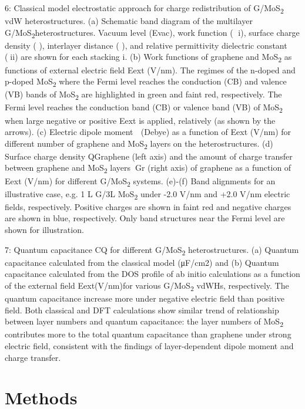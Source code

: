  
 6: Classical model electrostatic approach for charge redistribution of G/MoS\textsubscript{2} vdW heterostructures. (a) Schematic band diagram of the multilayer G/MoS\textsubscript{2}heterostructures. Vacuum level (Evac), work function ( i), surface charge density ( ), interlayer distance ( ),  and relative permittivity dielectric constant (ii) are shown for each stacking i. (b) Work functions of graphene and MoS\textsubscript{2} as functions of external electric field Eext (V/nm). The regimes of the n-doped and p-doped MoS\textsubscript{2} where the Fermi level reaches the conduction (CB) and valence (VB) bands of MoS\textsubscript{2} are highlighted in green and faint red, respectively. The Fermi level reaches the conduction band (CB) or valence band (VB) of MoS\textsubscript{2} when large negative or positive Eext is applied, relatively (as shown by the arrows). (c) Electric dipole moment  (Debye) as a function of Eext (V/nm) for different number of graphene and MoS\textsubscript{2} layers on the heterostructures. (d) Surface charge density QGraphene (left axis) and the amount of charge transfer between graphene and MoS\textsubscript{2} layersGr (right axis) of graphene as a function of Eext (V/nm) for different G/MoS\textsubscript{2} systems. (e)-(f) Band alignments for an illustrative case, e.g. 1 L G/3L MoS\textsubscript{2} under -2.0 V/nm and +2.0 V/nm electric fields, respectively. Positive charges are shown in faint red and negative charges are shown in blue, respectively. Only band structures near the Fermi level are shown for illustration. 
 
 7: Quantum capacitance CQ for different G/MoS\textsubscript{2} heterostructures. (a) Quantum capacitance calculated from the classical model    (μF/cm2)  and (b) Quantum capacitance calculated from the DOS profile of ab initio  calculations   as a function of the external field Eext(V/nm)for various G/MoS\textsubscript{2} vdWHs, respectively. The quantum capacitance increase more under negative electric field than positive field. Both classical and DFT calculations show similar trend of relationship between layer numbers and quantum capacitance: the layer numbers of MoS\textsubscript{2} contributes more to the total quantum capacitance than graphene under strong electric field, consistent with the findings of layer-dependent dipole moment and charge transfer. 

\section{Methods}
\label{sec:asym-methods}

